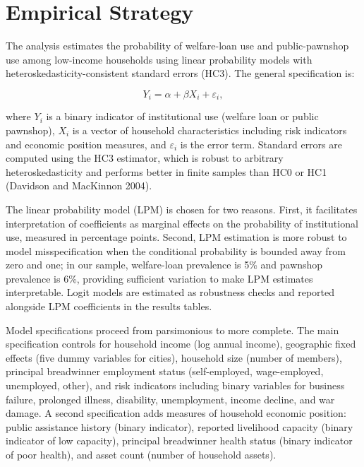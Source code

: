 \documentclass[12pt,a4paper]{article}
\begin{document}
\section{Empirical Strategy}

The analysis estimates the probability of welfare-loan use and public-pawnshop use among low-income households using linear probability models with heteroskedasticity-consistent standard errors (HC3). The general specification is:

\begin{equation}
Y_i = \alpha + \beta X_i + \varepsilon_i,
\end{equation}

\noindent where $Y_i$ is a binary indicator of institutional use (welfare loan or public pawnshop), $X_i$ is a vector of household characteristics including risk indicators and economic position measures, and $\varepsilon_i$ is the error term. Standard errors are computed using the HC3 estimator, which is robust to arbitrary heteroskedasticity and performs better in finite samples than HC0 or HC1 (Davidson and MacKinnon 2004).

The linear probability model (LPM) is chosen for two reasons. First, it facilitates interpretation of coefficients as marginal effects on the probability of institutional use, measured in percentage points. Second, LPM estimation is more robust to model misspecification when the conditional probability is bounded away from zero and one; in our sample, welfare-loan prevalence is 5\% and pawnshop prevalence is 6\%, providing sufficient variation to make LPM estimates interpretable. Logit models are estimated as robustness checks and reported alongside LPM coefficients in the results tables.

Model specifications proceed from parsimonious to more complete. The main specification controls for household income (log annual income), geographic fixed effects (five dummy variables for cities), household size (number of members), principal breadwinner employment status (self-employed, wage-employed, unemployed, other), and risk indicators including binary variables for business failure, prolonged illness, disability, unemployment, income decline, and war damage. A second specification adds measures of household economic position: public assistance history (binary indicator), reported livelihood capacity (binary indicator of low capacity), principal breadwinner health status (binary indicator of poor health), and asset count (number of household assets).
\end{document}
